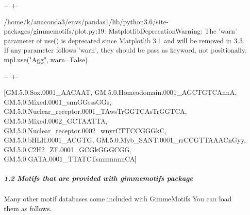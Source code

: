 \documentclass[letterpaper,10pt,english]{sphinxmanual}
\newlength\nbsphinxcodecellspacing
\begin{document}
{

\kern-\sphinxverbatimsmallskipamount\kern-\baselineskip
\kern+\FrameHeightAdjust\kern-\fboxrule
\vspace{\nbsphinxcodecellspacing}

\begin{sphinxVerbatim}[commandchars=\\\{\}]
/home/k/anaconda3/envs/pandas1/lib/python3.6/site-packages/gimmemotifs/plot.py:19: MatplotlibDeprecationWarning: The 'warn' parameter of use() is deprecated since Matplotlib 3.1 and will be removed in 3.3.  If any parameter follows 'warn', they should be pass as keyword, not positionally.
  mpl.use("Agg", warn=False)
\end{sphinxVerbatim}
}

{

\kern-\sphinxverbatimsmallskipamount\kern-\baselineskip
\kern+\FrameHeightAdjust\kern-\fboxrule
\vspace{\nbsphinxcodecellspacing}

\begin{sphinxVerbatim}[commandchars=\\\{\}]
\llap{\color{nbsphinxout}[1]:\,\hspace{\fboxrule}\hspace{\fboxsep}}[GM.5.0.Sox.0001\_AACAAT,
 GM.5.0.Homeodomain.0001\_AGCTGTCAnnA,
 GM.5.0.Mixed.0001\_snnGGsssGGs,
 GM.5.0.Nuclear\_receptor.0001\_TAwsTrGGTCAsTrGGTCA,
 GM.5.0.Mixed.0002\_GCTAATTA,
 GM.5.0.Nuclear\_receptor.0002\_wnyrCTTCCGGGkC,
 GM.5.0.bHLH.0001\_ACGTG,
 GM.5.0.Myb\_SANT.0001\_rrCCGTTAAACnGyy,
 GM.5.0.C2H2\_ZF.0001\_GCGkGGGCGG,
 GM.5.0.GATA.0001\_TTATCTsnnnnnnnCA]
\end{sphinxVerbatim}
}


\subparagraph{1.2 Motifs that are provided with gimmemotifs package}
\label{\detokenize{notebooks/02_motif_scan/motif_data_preparation/01_How_to_load_motif_data:1.2-Motifs-that-are-provided-with-gimmemotifs-package}}
Many other motif databases come included with GimmeMotifs You can load them as follows.
\end{document}
